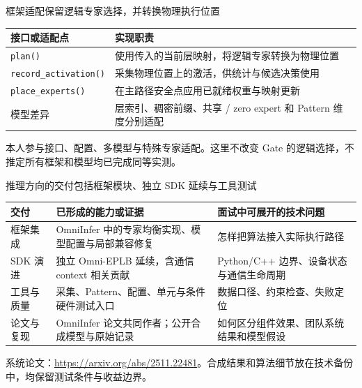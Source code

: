 \documentclass[aspectratio=169,10pt]{beamer}
\newcommand{\src}[1]{\vfill{\fontsize{6.7}{8}\selectfont\color{Muted}#1}\par}
\begin{document}
\begin{frame}{框架适配保留逻辑专家选择，并转换物理执行位置}
\begin{center}
\end{center}
\medskip
\renewcommand{\arraystretch}{1.45}
\begin{tabularx}{\textwidth}{@{}p{4cm}Y@{}}
\toprule 接口或适配点 & 实现职责 \\
\midrule
\texttt{plan()} & 使用传入的当前层映射，将逻辑专家转换为物理位置 \\
\texttt{record\_activation()} & 采集物理位置上的激活，供统计与候选决策使用 \\
\texttt{place\_experts()} & 在主路径安全点应用已就绪权重与映射更新 \\
模型差异 & 层索引、稠密前缀、共享 / zero expert 和 Pattern 维度分别适配 \\
\bottomrule
\end{tabularx}
\src{本人参与接口、配置、多模型与特殊专家适配。这里不改变 Gate 的逻辑选择，不推定所有框架和模型均已完成同等实测。}
\end{frame}

\begin{frame}{推理方向的交付包括框架模块、独立 SDK 延续与工具测试}
\renewcommand{\arraystretch}{1.55}
\begin{tabularx}{\textwidth}{@{}p{2.8cm}YY@{}}
\toprule 交付 & 已形成的能力或证据 & 面试中可展开的技术问题 \\
\midrule
框架集成 & OmniInfer 中的专家均衡实现、模型配置与局部兼容修复 & 怎样把算法接入实际执行路径 \\
SDK 演进 & 独立 Omni-EPLB 延续，含通信 context 相关贡献 & Python/C++ 边界、设备状态与通信生命周期 \\
工具与质量 & 采集、Pattern、配置、单元与条件硬件测试入口 & 数据口径、约束检查、失败定位 \\
论文与复现 & OmniInfer 论文共同作者；公开合成模型与原始记录 & 如何区分组件效果、团队系统结果和模型假设 \\
\bottomrule
\end{tabularx}
\src{系统论文：\url{https://arxiv.org/abs/2511.22481}。合成结果和算法细节放在技术备份中，均保留测试条件与收益边界。}
\end{frame}
\end{document}
